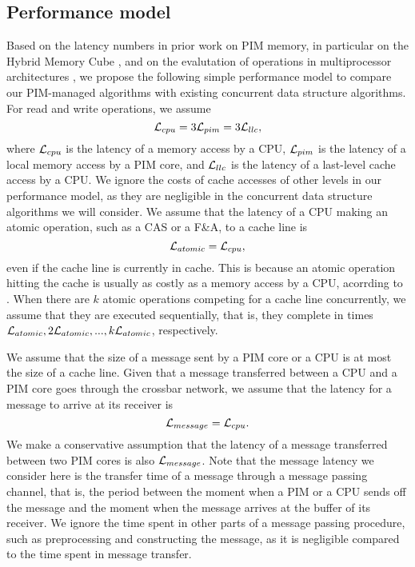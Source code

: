 \subsection{Performance model}
\label{section:performance_model}
Based on the latency numbers in prior work on PIM memory, 
in particular on the Hybrid Memory Cube \cite{website:HMC, Azarkhish16}, 
and on the evalutation of operations in multiprocessor architectures \cite{David13},
we propose the following simple performance model to compare 
our PIM-managed algorithms with existing concurrent data structure algorithms.
For read and write operations, we assume 
$$\mathcal{L}_{cpu} = 3\mathcal{L}_{pim} = 3\mathcal{L}_{llc},$$
where $\mathcal{L}_{cpu}$ is the latency of a memory access by a CPU,
$\mathcal{L}_{pim}$ is the latency of a local memory access by a PIM core, and
$\mathcal{L}_{llc}$ is the latency of a last-level cache access by a CPU.
We ignore the costs of cache accesses of other levels in our performance model,
as they are negligible in the concurrent data structure algorithms we will consider.
We assume that the latency of a CPU making an atomic operation, such as a CAS or a F\&A,
to a cache line is 
$$\mathcal{L}_{atomic} = \mathcal{L}_{cpu},$$ 
even if the cache line is currently in cache.
This is because an atomic operation hitting the cache is usually 
as costly as a memory access by a CPU, acorrding to \cite{David13}.
When there are $k$ atomic operations competing for a cache line concurrently,
we assume that they are executed sequentially, that is,
they complete in times $\mathcal{L}_{atomic}, 2\mathcal{L}_{atomic},..., k\mathcal{L}_{atomic}$, respectively.

We assume that the size of a message sent by a PIM core or a CPU is at most 
the size of a cache line.
Given that a message transferred between a CPU and a PIM core goes through
the crossbar network, we assume that the latency for a message to arrive at its receiver is 
$$\mathcal{L}_{message} = \mathcal{L}_{cpu}.$$
We make a conservative assumption that the latency of a message transferred 
between two PIM cores is also $\mathcal{L}_{message}$.
Note that the message latency we consider here is the transfer time of a message
through a message passing channel, that is, the period between the moment
when a PIM or a CPU sends off the message and the moment when
the message arrives at the buffer of its receiver.
We ignore the time spent in other parts of a message passing procedure,
such as preprocessing and constructing the message,
as it is negligible compared to the time spent in message transfer.


